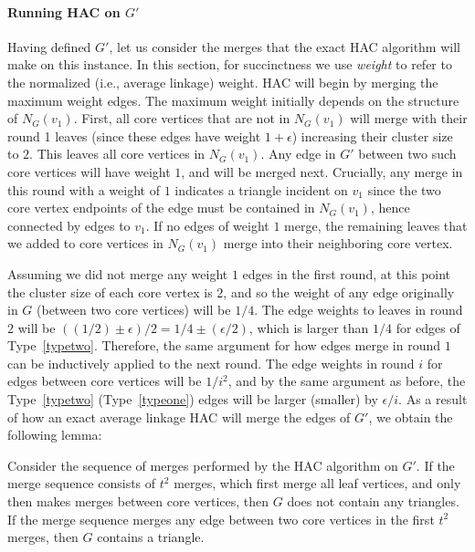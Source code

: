 \paragraph{Running HAC on $G'$}
Having defined $G'$, let us consider the merges that the exact HAC algorithm will make on this instance.
In this section, for succinctness we use {\em weight} to refer to the normalized (i.e., average linkage) weight.
HAC will begin by merging the maximum weight edges.
The maximum weight initially depends on the structure of $N_{G}(v_1)$.
First, all core vertices that are not in $N_{G}(v_1)$ will merge with their round 1 leaves (since these edges have weight $1+\epsilon$) increasing their cluster size to $2$.
This leaves all core vertices in $N_{G}(v_1)$. Any edge in $G'$ between two such core vertices will have weight $1$, and will be merged next.
Crucially, any merge in this round with a weight of $1$ indicates a triangle incident on $v_1$ since the two core vertex endpoints of the edge must be contained in $N_{G}(v_1)$, hence connected by 
edges to $v_1$.
If no edges of weight $1$ merge, the remaining leaves that we added to core vertices in $N_{G}(v_1)$ merge into their neighboring core vertex.

Assuming we did not merge any weight $1$ edges in the first round, at this point the cluster size of each core vertex is $2$, and so the weight of any edge originally in $G$ (between two core vertices) will be $1/4$.
The edge weights to leaves in round $2$ will be $((1/2) \pm \epsilon)/2 = 1/4 \pm (\epsilon / 2)$, which is larger than $1/4$ for edges of Type~\ref{typetwo}.
Therefore, the same argument for how edges merge in round $1$ can be inductively applied to the next round.
The edge weights in round $i$ for edges between core vertices will be $1/i^2$, and by the same argument as before, the Type~\ref{typetwo} (Type~\ref{typeone}) edges will be larger (smaller) by $\epsilon/i$.
As a result of how an exact average linkage HAC will merge the edges of $G'$, we obtain the following lemma:

\begin{lemma}
Consider the sequence of merges performed by the HAC algorithm on $G'$. If the merge sequence consists of $t^2$ merges, which first merge all leaf vertices, and only then makes merges between core vertices, then $G$ does not contain any triangles.
If the merge sequence merges any edge between two core vertices in the first $t^2$ merges, then $G$ contains a triangle.
\end{lemma}

